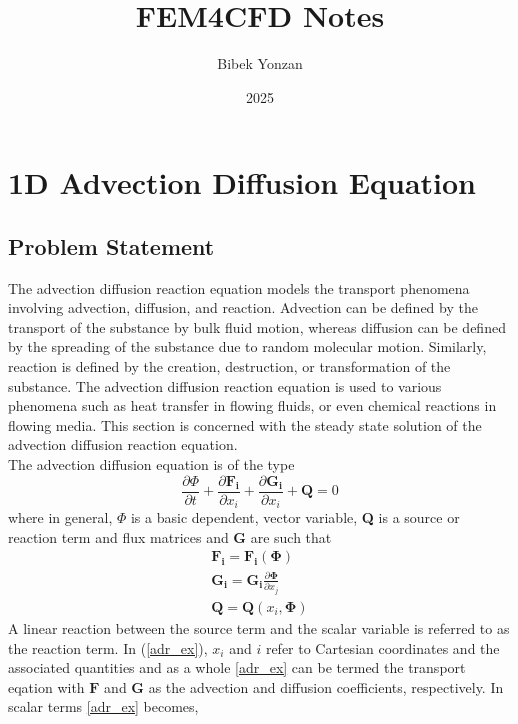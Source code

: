 \documentclass[10pt, oneside]{article}
\title{\textbf{FEM4CFD Notes}}
\author{Bibek Yonzan}
\date{2025}
\begin{document}
\maketitle
\tableofcontents

\vspace{.25in}

\section{1D Advection Diffusion Equation}

\subsection{Problem Statement}

The advection diffusion reaction equation models the transport phenomena involving advection, diffusion, and reaction. Advection can be defined by the transport of the substance by bulk fluid motion, whereas diffusion can be defined by the spreading of the substance due to random molecular motion. Similarly, reaction is defined by the creation, destruction, or transformation of the substance. The advection diffusion reaction equation is used to various phenomena such as heat transfer in flowing fluids, or even chemical reactions in flowing media. This section is concerned with the steady state solution of the advection diffusion reaction equation. \\
The advection diffusion equation is of the type
   \begin{equation}
       \frac{\partial\Phi}{\partial t} + \frac{\partial{\boldsymbol{F_i}}}{\partial{x_i}} + \frac{\partial\boldsymbol{G_i}}{\partial{x_i}} + \boldsymbol{Q} = 0
   \end{equation}
where in general, $\Phi$ is a basic dependent, vector variable, \textbf{Q} is a source or reaction term and flux matrices  and \textbf{G} are such that
    \begin{equation}\label{adr_ex}
          \begin{aligned}
	    \boldsymbol{F_i} = \boldsymbol{F_i}(\boldsymbol{\Phi})\\
	    \boldsymbol{G_i} = \boldsymbol{G_i}\frac{\partial{\boldsymbol{\Phi}}}{\partial{x_j}}\\
	    \boldsymbol{Q} = \boldsymbol{Q}(x_i, \boldsymbol{\Phi})
          \end{aligned}
    \end{equation}
    A linear reaction between the source term and the scalar variable is referred to as the reaction term. In (\ref{adr_ex}), $x_i$ and $i$ refer to Cartesian coordinates and the associated quantities and as a whole \ref{adr_ex} can be termed the transport eqation with $\boldsymbol{F}$ and $\boldsymbol{G}$ as the advection and diffusion coefficients, respectively. In scalar terms \ref{adr_ex} becomes,
\end{document}
